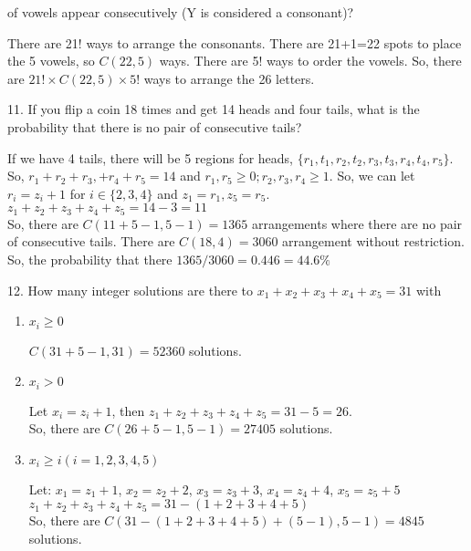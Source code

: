 \documentclass[12pt]{article}
\begin{document}
of vowels appear consecutively (Y is considered a consonant)?
\begin{solution}
    There are 21! ways to arrange the consonants. 
    There are 21+1=22 spots to place the 5 vowels, so $C(22, 5)$ ways.
    There are 5! ways to order the vowels. 
    So, there are $21!\times C(22, 5) \times 5!$ ways to arrange the 26 
    letters.  
\end{solution}
11. If you flip a coin 18 times and get 14 heads and four tails, what is the probability
that there is no pair of consecutive tails?
\begin{solution}
    If we have 4 tails, there will be 5 regions for heads, 
    $\{r_1, t_1, r_2, t_2, r_3, t_3, r_4, t_4, r_5\}$. 
    So, $r_1 + r_2 + r_3, + r_4 + r_5 = 14$ and $r_1, r_5 \ge 0; 
    r_2, r_3, r_4 \ge 1$. 
    So, we can let $r_i = z_i + 1$ for $i \in \{2, 3, 4\}$ and $z_1=r_1,
    z_5=r_5$. \\
    $z_1+z_2+z_3+z_4+z_5=14-3=11$\\
    So, there are $C(11 + 5 - 1, 5-1)=1365$ arrangements where there are 
    no pair of consecutive tails. 
    There are $C(18, 4) = 3060$ arrangement without restriction. So, the 
    probability that there $1365/3060=0.446=44.6\%$
\end{solution}
12. How many integer solutions are there to $x_1 + x_2 + x_3 + x_4 + x_5 
= 31$ with 
\begin{enumerate}[label=(\alph*)]
    \item $x_i \ge 0$ 
    \begin{solution}
        $C(31+5-1, 31) = 52360$ solutions. 
    \end{solution}
    \item $x_i > 0$ 
    \begin{solution}
        Let $x_i = z_i+1$, then $z_1+z_2+z_3+z_4+z_5=31-5=26$.\\
        So, there are $C(26 + 5 - 1, 5-1) = 27405$ solutions. 
    \end{solution}
    \item $x_i \ge i(i = 1, 2, 3, 4, 5)$
    \begin{solution}
        Let: $x_1 = z_1 + 1$, $x_2 = z_2 + 2$, $x_3 = z_3 + 3$, 
        $x_4 = z_4 + 4$, $x_5 = z_5 + 5$\\
        $z_1+z_2+z_3+z_4+z_5 = 31-(1+2+3+4+5)$\\
        So, there are $C(31-(1+2+3+4+5)+(5-1), 5-1)=4845$ solutions. 
    \end{solution}
\end{enumerate}
\end{document}
